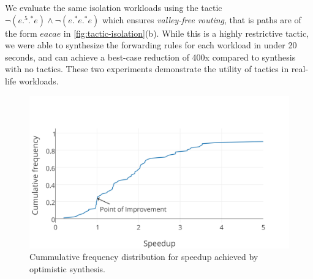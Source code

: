 We evaluate the same isolation workloads using the tactic $\neg (e .^5 .^* e) \wedge \neg (e .^* e .^* e)$
which ensures {\em valley-free routing}, that is paths are of the form $eacae$ in \cref{fig:tactic-isolation}(b). While this is a highly
restrictive tactic, we were able to synthesize the forwarding rules for each workload in under 20 seconds, 
and can achieve a best-case reduction of 400x compared to synthesis with no tactics.
 These two experiments demonstrate the utility of tactics in real-life workloads. 


%
%
\begin{figure}
	\includegraphics[width=\columnwidth]{figures/opt-cdf.png}
	\caption{Cummulative frequency distribution for speedup achieved by optimistic synthesis.}
	\label{fig:opt-cdf}
\end{figure}
